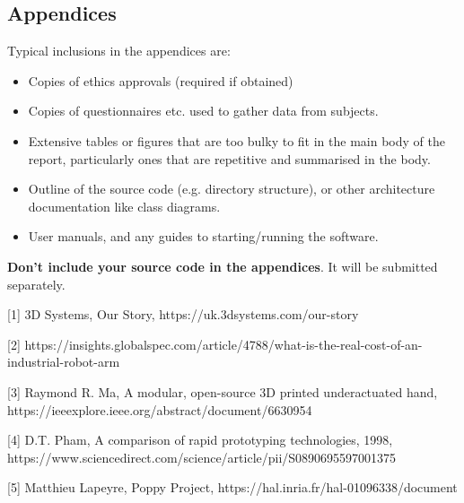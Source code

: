 \documentclass{l4proj}
\begin{document}
\begin{appendices}

\chapter{Appendices}

Typical inclusions in the appendices are:

\begin{itemize}
\item
 Copies of ethics approvals (required if obtained)
\item
 Copies of questionnaires etc. used to gather data from subjects.
\item
 Extensive tables or figures that are too bulky to fit in the main body of
 the report, particularly ones that are repetitive and summarised in the body.

\item Outline of the source code (e.g. directory structure), or other architecture documentation like class diagrams.

\item User manuals, and any guides to starting/running the software.

\end{itemize}

\textbf{Don't include your source code in the appendices}. It will be
submitted separately.

\end{appendices}







[1] 3D Systems, Our Story, https://uk.3dsystems.com/our-story

[2] https://insights.globalspec.com/article/4788/what-is-the-real-cost-of-an-industrial-robot-arm

[3] Raymond R. Ma, A modular, open-source 3D printed underactuated hand, https://ieeexplore.ieee.org/abstract/document/6630954

[4] D.T. Pham, A comparison of rapid prototyping technologies, 1998, https://www.sciencedirect.com/science/article/pii/S0890695597001375

[5] Matthieu Lapeyre, Poppy Project, https://hal.inria.fr/hal-01096338/document
\end{document}
